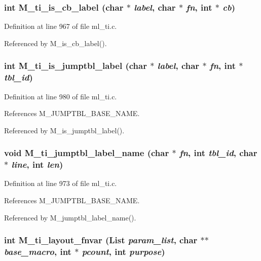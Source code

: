 \subsubsection{\setlength{\rightskip}{0pt plus 5cm}int M\_\-ti\_\-is\_\-cb\_\-label (char $\ast$ {\em label}, char $\ast$ {\em fn}, int $\ast$ {\em cb})}\label{m__ti_8h_a750c25c0c4205d01c954b6a49cb325a}




Definition at line 967 of file ml\_\-ti.c.

Referenced by M\_\-is\_\-cb\_\-label().
\subsubsection{\setlength{\rightskip}{0pt plus 5cm}int M\_\-ti\_\-is\_\-jumptbl\_\-label (char $\ast$ {\em label}, char $\ast$ {\em fn}, int $\ast$ {\em tbl\_\-id})}\label{m__ti_8h_f4ed8b1e5ececfdb0268ccdb9d071a5d}




Definition at line 980 of file ml\_\-ti.c.

References M\_\-JUMPTBL\_\-BASE\_\-NAME.

Referenced by M\_\-is\_\-jumptbl\_\-label().
\subsubsection{\setlength{\rightskip}{0pt plus 5cm}void M\_\-ti\_\-jumptbl\_\-label\_\-name (char $\ast$ {\em fn}, int {\em tbl\_\-id}, char $\ast$ {\em line}, int {\em len})}\label{m__ti_8h_8f4c814faa0dc82fde65e781a8b64ea7}




Definition at line 973 of file ml\_\-ti.c.

References M\_\-JUMPTBL\_\-BASE\_\-NAME.

Referenced by M\_\-jumptbl\_\-label\_\-name().
\subsubsection{\setlength{\rightskip}{0pt plus 5cm}int M\_\-ti\_\-layout\_\-fnvar (\bf{List} {\em param\_\-list}, char $\ast$$\ast$ {\em base\_\-macro}, int $\ast$ {\em pcount}, int {\em purpose})}\label{m__ti_8h_cb96589fb7b8f72ef4f020421e32c6c1}





